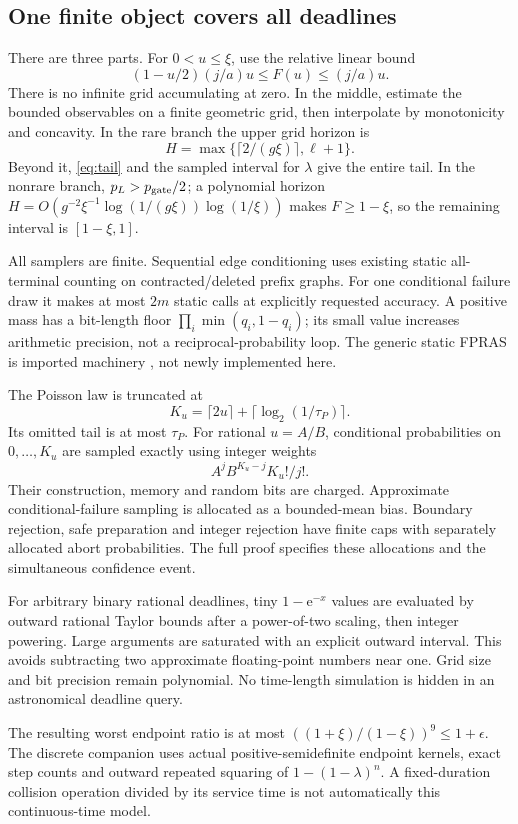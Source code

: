 \documentclass[11pt]{article}
\newcommand{\ee}{\mathrm e}
\begin{document}
\subsection{One finite object covers all deadlines}
There are three parts. For \(0<u\le\xi\), use the relative linear bound
\[
 (1-u/2)(j/a)u\le F(u)\le(j/a)u.
\]
There is no infinite grid accumulating at zero. In the middle, estimate the bounded observables on a finite geometric grid, then interpolate by monotonicity and concavity. In the rare branch the upper grid horizon is
\[
 H=\max\{\lceil2/(g\xi)\rceil,\ell+1\}.
\]
Beyond it, \eqref{eq:tail} and the sampled interval for \(\lambda\) give the entire tail. In the nonrare branch, \(p_L>p_{\rm gate}/2\); a polynomial horizon \(H=O(g^{-2}\xi^{-1}\log(1/(g\xi))\log(1/\xi))\) makes \(F\ge1-\xi\), so the remaining interval is \([1-\xi,1]\).

All samplers are finite. Sequential edge conditioning uses existing static all-terminal counting on contracted/deleted prefix graphs. For one conditional failure draw it makes at most \(2m\) static calls at explicitly requested accuracy. A positive mass has a bit-length floor \(\prod_i\min(q_i,1-q_i)\); its small value increases arithmetic precision, not a reciprocal-probability loop. The generic static FPRAS is imported machinery \cite{karger,cen}, not newly implemented here.

The Poisson law is truncated at
\[
 K_u=\lceil2u\rceil+\lceil\log_2(1/\tau_P)\rceil.
\]
Its omitted tail is at most \(\tau_P\). For rational \(u=A/B\), conditional probabilities on \(0,\ldots,K_u\) are sampled exactly using integer weights
\[
 A^j B^{K_u-j}K_u!/j!.
\]
Their construction, memory and random bits are charged. Approximate conditional-failure sampling is allocated as a bounded-mean bias. Boundary rejection, safe preparation and integer rejection have finite caps with separately allocated abort probabilities. The full proof specifies these allocations and the simultaneous confidence event.

For arbitrary binary rational deadlines, tiny \(1-\ee^{-x}\) values are evaluated by outward rational Taylor bounds after a power-of-two scaling, then integer powering. Large arguments are saturated with an explicit outward interval. This avoids subtracting two approximate floating-point numbers near one. Grid size and bit precision remain polynomial. No time-length simulation is hidden in an astronomical deadline query.

The resulting worst endpoint ratio is at most \(((1+\xi)/(1-\xi))^9\le1+\epsilon\). The discrete companion uses actual positive-semidefinite endpoint kernels, exact step counts and outward repeated squaring of \(1-(1-\lambda)^n\). A fixed-duration collision operation divided by its service time is not automatically this continuous-time model.
\end{document}
